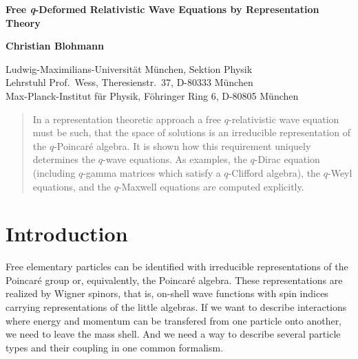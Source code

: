 \documentclass[12pt,a4paper]{article}
\begin{document}

\vspace{4em}
\begin{center}

{\Large{\bf Free \textit{q}-Deformed Relativistic Wave Equations by
  Representation Theory}}

\vspace{3em}

\textbf{Christian Blohmann}

\vspace{1em}

Ludwig-Maximilians-Universit\"at M\"unchen, Sektion Physik\\
Lehrstuhl Prof.\ Wess, Theresienstr.\ 37, D-80333 M\"unchen\\[1em]

Max-Planck-Institut f\"ur Physik,
        F\"ohringer Ring 6, D-80805 M\"unchen\\[1em]

\end{center}

\vspace{1em}

\begin{abstract}
  In a representation theoretic approach a free $q$-relativistic wave
  equation must be such, that the space of solutions is an irreducible
  representation of the $q$-Poincar{\'e} algebra. It is shown how this
  requirement uniquely determines the $q$-wave equations. As examples,
  the $q$-Dirac equation (including $q$-gamma matrices which satisfy a
  $q$-Clifford algebra), the $q$-Weyl equations, and the $q$-Maxwell
  equations are computed explicitly.
\end{abstract}

\section{Introduction}

Free elementary particles can be identified with irreducible
representations of the Poincar{\'e} group \cite{Wigner:1939} or,
equivalently, the Poincar{\'e} algebra. These representations are
realized by Wigner spinors, that is, on-shell wave functions with spin
indices carrying representations of the little algebras. If we want to
describe interactions where energy and momentum can be transfered from
one particle onto another, we need to leave the mass shell. And we
need a way to describe several particle types and their coupling in
one common formalism.
\end{document}
